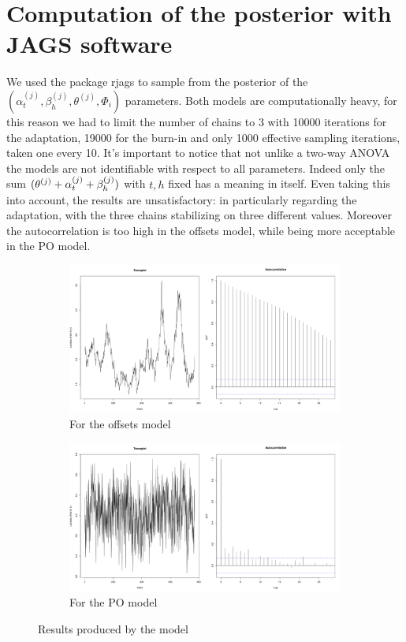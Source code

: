 \documentclass[11pt,twoside]{report}
\begin{document}
\section{Computation of the posterior with JAGS software}
We used the package rjags to sample from the posterior of the $(\alpha_{t}^{(j)}, \beta_{h}^{(j)}, \theta^{(j)}, \Phi_i)$ parameters. Both models are computationally heavy, for this reason we had to limit the number of chains to 3 with 10000 iterations for the adaptation, 19000 for the burn-in and only 1000 effective sampling iterations, taken one every 10. It's important to notice that not unlike a two-way ANOVA the models are not identifiable with respect to all parameters. Indeed only the sum $(\boldmath{\theta^{(j)} +  \alpha^{(j)}_{t} + \beta_{h}^{(j)})}$ with $t,h$ fixed has a meaning in itself. Even taking this into account, the results are unsatisfactory: in particularly regarding the adaptation, with the three chains stabilizing on three different values. Moreover the autocorrelation is too high in the offsets model, while being more acceptable in the PO model. \\

\begin{figure}[H]
	\begin{subfigure}[H]{.5\linewidth}
		\centering
		\includegraphics[width=70 mm]{pictures/posterior_off.png}
		\caption{For the offsets model}
		\label{fig:post_off}
	\end{subfigure}
	\hfill
	\begin{subfigure}[H]{.5\linewidth}
		\centering
		\includegraphics[width=70 mm]{pictures/posterior_nbn.png}
		\caption{For the PO model}
		\label{fig:post_nbn}
	\end{subfigure}%
	\caption{Results produced by the model}
\end{figure}
\end{document}
